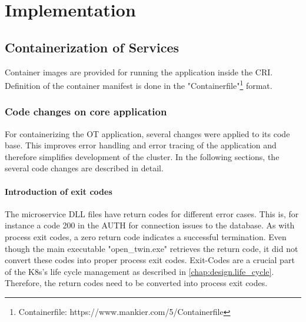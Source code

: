 \chapter{Implementation} %

\label{chap:implementation} %



\section{Containerization of Services}
Container images are provided for running the application inside the \ac{CRI}. Definition of the container manifest is done in the "Containerfile"\footnote{Containerfile: https://www.mankier.com/5/Containerfile} format.


\subsection{Code changes on core application}
For containerizing the \ac{OT} application, several changes were applied to its code base. This improves error handling and error tracing of the application and therefore simplifies development of the cluster. In the following sections, the several code changes are described in detail.

\subsubsection*{Introduction of exit codes}
The microservice \ac{DLL} files have return codes for different error cases. This is, for instance a code 200 in the \ac{AUTH} for connection issues to the database. As with process exit codes, a zero return code indicates a successful termination. Even though the main executable "open\_twin.exe" retrieves the return code, it did not convert these codes into proper process exit codes. 
Exit-Codes are a crucial part of the \ac{K8s}'s life cycle management as described in \autoref{chap:design.life_cycle}. Therefore, the return codes need to be converted into process exit codes.

